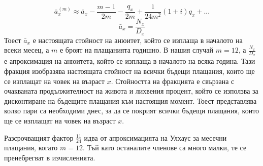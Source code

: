 \documentclass[a4paper,12pt]{article}
\begin{document}
\[\bar{a}^{(m)}_x\approx \bar{a}_x -\frac{m-1}{2m}-\frac{q_x}{2m}+\frac{1}{24m^2}(1+i)q_x+...\]
\[\bar{a}_x =\frac{N_x}{D_{x}}\]
Тоест $\bar{a}_x$ е настоящата стойност на анюитет, който се изплаща в началото на всеки месец, а $m$ е броят на плащанията годишно. В нашия случай $m=12$, а $\frac{N_x}{D_x}$ е апроксимация на анюитета, който се изплаща в началото на всяка година. Тази фракция изобразява настоящата стойност на всички бъдещи плащания, които ще се изплащат на човек на възраст $x$. Стойността на фракцията е свързана с очакваната продължителност на живота и лихвения процент, който се използва за дисконтиране на бъдещите плащания към настоящия момент. Тоест представлява колко пари са необходими днес, за да се покрият всички бъдещи плащания, които ще се изплащат на човек на възраст $x$.

Разсрочващият фактор $\frac{11}{24}$ идва от апроксимацията на Улхаус за месечни плащания, когато $m=12$. Тъй като останалите членове са много малки, те се пренебрегват в изчисленията.

\newpage
\end{document}
